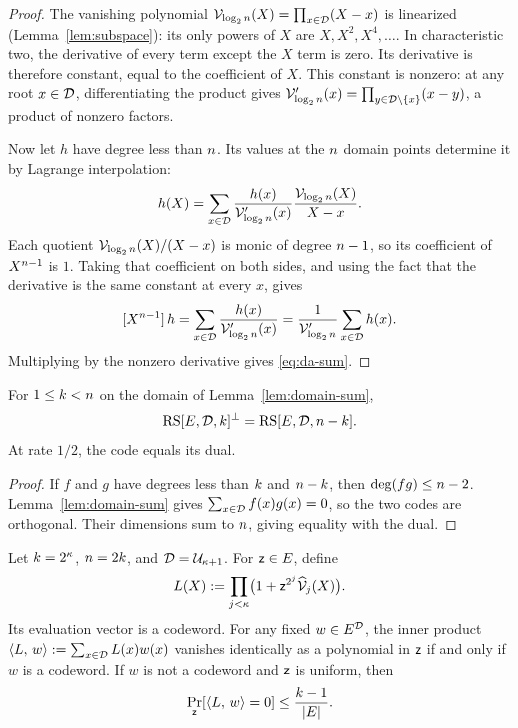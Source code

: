 \begin{proof}
The vanishing polynomial $\mathcal{V}_{\log_2n}(X)=\prod_{x\in\mathcal{D}}(X-x)$ is linearized (Lemma~\ref{lem:subspace}): its only powers of $X$ are $X,X^2,X^4,\ldots$. In characteristic two, the derivative of every term except the $X$ term is zero. Its derivative is therefore constant, equal to the coefficient of $X$. This constant is nonzero: at any root $x\in\mathcal{D}$, differentiating the product gives $\mathcal{V}_{\log_2n}'(x)=\prod_{y\in\mathcal{D}\setminus\{x\}}(x-y)$, a product of nonzero factors.

Now let $h$ have degree less than $n$. Its values at the $n$ domain points determine it by Lagrange interpolation:
\[
  h(X)=\sum_{x\in\mathcal{D}}
    \frac{h(x)}{\mathcal{V}_{\log_2n}'(x)}
    \frac{\mathcal{V}_{\log_2n}(X)}{X-x}.
\]
Each quotient $\mathcal{V}_{\log_2n}(X)/(X-x)$ is monic of degree $n-1$, so its coefficient of $X^{n-1}$ is $1$. Taking that coefficient on both sides, and using the fact that the derivative is the same constant at every $x$, gives
\[
  [X^{n-1}]\,h
  =\sum_{x\in\mathcal{D}}\frac{h(x)}{\mathcal{V}_{\log_2n}'(x)}
  =\frac{1}{\mathcal{V}_{\log_2n}'}\sum_{x\in\mathcal{D}}h(x).
\]
Multiplying by the nonzero derivative gives \eqref{eq:da-sum}.
\end{proof}

\begin{corollary}\label{cor:rs-dual}
For $1\le k<n$ on the domain of Lemma~\ref{lem:domain-sum},
\[
  \mathrm{RS}[E,\mathcal{D},k]^\perp=\mathrm{RS}[E,\mathcal{D},n-k].
\]
At rate $1/2$, the code equals its dual.
\end{corollary}

\begin{proof}
If $f$ and $g$ have degrees less than $k$ and $n-k$, then $\deg(fg)\le n-2$. Lemma~\ref{lem:domain-sum} gives $\sum_{x\in\mathcal{D}}f(x)g(x)=0$, so the two codes are orthogonal. Their dimensions sum to $n$, giving equality with the dual.
\end{proof}

\begin{proposition}\label{prop:rs-membership}
Let $k=2^\kappa$, $n=2k$, and $\mathcal{D}=\mathcal{U}_{\kappa+1}$. For $\mathsf{z}\in E$, define
\begin{equation}\label{eq:dual-product}
  L(X):=\prod_{j<\kappa}\bigl(1+\mathsf{z}^{2^j}\widehat{\mathcal{V}}_{j}(X)\bigr).
\end{equation}
Its evaluation vector is a codeword. For any fixed $w\in E^{\mathcal{D}}$, the inner product $\langle L,\, w \rangle:=\sum_{x\in\mathcal{D}}L(x)w(x)$ vanishes identically as a polynomial in $\mathsf{z}$ if and only if $w$ is a codeword. If $w$ is not a codeword and $\mathsf{z}$ is uniform, then
\[
  \Pr_{\mathsf{z}}[\langle L,\, w \rangle=0]\le\frac{k-1}{|E|}.
\]
\end{proposition}

